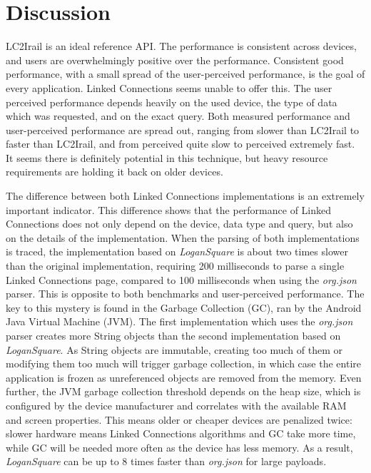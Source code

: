 \documentclass[twocolumn]{phdsymp} %
\begin{document}
\section{Discussion}
LC2Irail is an ideal reference API. The performance is consistent across devices, and users are overwhelmingly positive over the performance. Consistent good performance, with a small spread of the user-perceived performance, is the goal of every application. Linked Connections seems unable to offer this. The user perceived performance depends heavily on the used device, the type of data which was requested, and on the exact query. Both measured performance and user-perceived performance are spread out, ranging from slower than LC2Irail to faster than LC2Irail, and from perceived quite slow to perceived extremely fast. It seems there is definitely potential in this technique, but heavy resource requirements are holding it back on older devices.

The difference between both Linked Connections implementations is an extremely important indicator. This difference shows that the performance of Linked Connections
does not only depend on the device, data type and query, but also on the details of the implementation. When the parsing of both implementations is traced, the implementation based on \emph{LoganSquare} is about two times slower than the original implementation, requiring 200 milliseconds to parse a single Linked Connections page, compared to 100 milliseconds when using the \emph{org.json} parser. This is opposite to both benchmarks and user-perceived performance. The key to this mystery is found in the Garbage Collection (GC), ran by the Android Java Virtual Machine (JVM). The first implementation which uses the \emph{org.json} parser creates more String objects than the second implementation based on \emph{LoganSquare}. As String objects are immutable, creating too much of them or modifying them too much will trigger garbage collection, in which case the entire application is frozen as unreferenced objects are removed from the memory. Even further, the JVM garbage collection threshold depends on the heap size, which is configured by the device manufacturer and correlates with the available RAM and screen properties. This
means older or cheaper devices are penalized twice: slower hardware means Linked Connections algorithms and GC take more time, while GC will be needed more often as the device has less memory. As a result, \emph{LoganSquare} can be up to 8 times faster than \emph{org.json} for large payloads.
\end{document}
